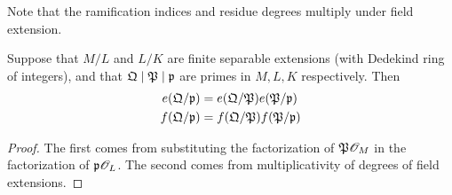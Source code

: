 Note that the ramification indices and residue degrees multiply under field extension.
\begin{pr}
Suppose that $M/L$ and $L/K$ are finite separable extensions (with Dedekind ring of integers), and that $\mathfrak{Q}\mid \mathfrak{P}\mid \mathfrak{p}$ are primes in $M,L,K$ respectively. Then
\begin{align*}
e(\mathfrak{Q}/\mathfrak{p})&=e(\mathfrak{Q}/\mathfrak{P})e(\mathfrak{P}/\mathfrak{p})\\
f(\mathfrak{Q}/\mathfrak{p})&=f(\mathfrak{Q}/\mathfrak{P})f(\mathfrak{P}/\mathfrak{p})
\end{align*}
\end{pr}
\begin{proof}
The first comes from substituting the factorization of $\mathfrak{P}\mathscr{O}_M$ in the factorization of $\mathfrak{p}\mathscr{O}_L$. The second comes from multiplicativity of degrees of field extensions.
\end{proof}
